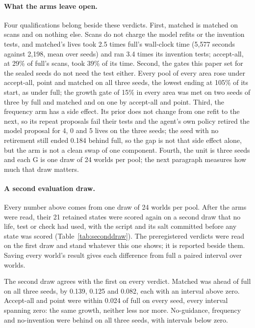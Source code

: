 \documentclass[11pt]{article}
\begin{document}
\paragraph{What the arms leave open.} Four qualifications belong beside these verdicts. First, matched is matched on scans and on nothing else. Scans do not charge the model refits or the invention tests, and matched's lives took 2.5 times full's wall-clock time (5,577 seconds against 2,198, mean over seeds) and ran 3.4 times its invention tests; accept-all, at 29\% of full's scans, took 39\% of its time. Second, the gates this paper set for the sealed seeds do not need the test either. Every pool of every area rose under accept-all, point and matched on all three seeds, the lowest ending at 105\% of its start, as under full; the growth gate of 15\% in every area was met on two seeds of three by full and matched and on one by accept-all and point. Third, the frequency arm has a side effect. Its prior does not change from one refit to the next, so its repeat proposals fail their tests and the agent's own policy retired the model proposal for 4, 0 and 5 lives on the three seeds; the seed with no retirement still ended 0.184 behind full, so the gap is not that side effect alone, but the arm is not a clean swap of one component. Fourth, the unit is three seeds and each G is one draw of 24 worlds per pool; the next paragraph measures how much that draw matters.

\paragraph{A second evaluation draw.} Every number above comes from one draw of 24 worlds per pool. After the arms were read, their 21 retained states were scored again on a second draw that no life, test or check had used, with the script and its salt committed before any state was scored (Table~\ref{tab:seconddraw}). The preregistered verdicts were read on the first draw and stand whatever this one shows; it is reported beside them. Saving every world's result gives each difference from full a paired interval over worlds.

The second draw agrees with the first on every verdict. Matched was ahead of full on all three seeds, by 0.139, 0.125 and 0.082, each with an interval above zero. Accept-all and point were within 0.024 of full on every seed, every interval spanning zero: the same growth, neither less nor more. No-guidance, frequency and no-invention were behind on all three seeds, with intervals below zero.
\end{document}
